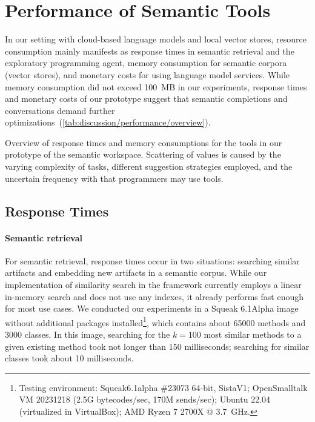 
\section{Performance of Semantic Tools}
\label{sec:discussion/performance}

In our setting with cloud-based language models and local vector stores, resource consumption mainly manifests as response times in semantic retrieval and the exploratory programming agent, memory consumption for semantic corpora (vector stores), and monetary costs for using language model services.
While memory consumption did not exceed \qty{100}{MB} in our experiments, response times and monetary costs of our prototype suggest that semantic completions and conversations demand further optimizations~(\cref{tab:discussion/performance/overview}).

\begin{table}
	\centering
	\footnotesize
	\caption[Overview of response times and memory consumptions for the tools in our prototype of the semantic workspace.]{
		Overview of response times and memory consumptions for the tools in our prototype of the semantic workspace.
		Scattering of values is caused by the varying complexity of tasks, different suggestion strategies employed, and the uncertain frequency with that programmers may use tools.
	}
	\label{tab:discussion/performance/overview}
\end{table}

\subsection*{Response Times}
\label{sec:discussion/performance/latencies}


\paragraph{Semantic retrieval}
\label{par:discussion/performance/latencies/retrieval}

For semantic retrieval, response times occur in two situations: searching similar artifacts and embedding new artifacts in a semantic corpus.
While our implementation of similarity search in the \semtex framework currently employs a linear in-memory search and does not use any indexes, it already performs fast enough for most use cases.
We conducted our experiments in a Squeak 6.1Alpha image without additional packages installed\footnote{Testing environment: Squeak6.1alpha \#23073 64-bit, SistaV1; OpenSmalltalk VM 20231218 (2.5G bytecodes/sec, 170M sends/sec); Ubuntu 22.04 (virtualized in VirtualBox); AMD Ryzen 7 2700X @ \qty{3.7}{GHz}.}, which contains about \num{65000} methods and \num{3000} classes.
In this image, searching for the $k = 100$ most similar methods to a given existing method took not longer than 150 milliseconds; searching for similar classes took about 10 milliseconds.

